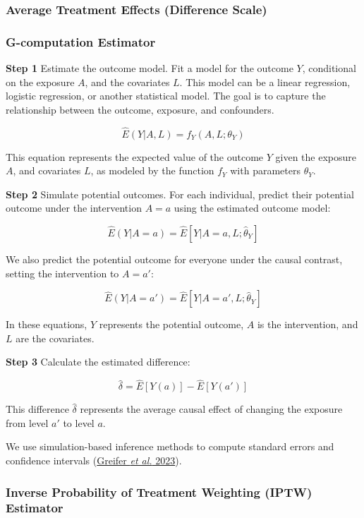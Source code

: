 \documentclass[
  singlecolumn]{article}
\begin{document}
\subsubsection{Average Treatment Effects (Difference
Scale)}\label{average-treatment-effects-difference-scale}

\subsubsection{\texorpdfstring{\textbf{G-computation
Estimator}}{G-computation Estimator}}\label{g-computation-estimator}

\textbf{Step 1} Estimate the outcome model. Fit a model for the outcome
\(Y\), conditional on the exposure \(A\), and the covariates \(L\). This
model can be a linear regression, logistic regression, or another
statistical model. The goal is to capture the relationship between the
outcome, exposure, and confounders.

\[ \hat{E}(Y|A,L) = f_Y(A,L; \theta_Y) \]

This equation represents the expected value of the outcome \(Y\) given
the exposure \(A\), and covariates \(L\), as modeled by the function
\(f_Y\) with parameters \(\theta_Y\).

\textbf{Step 2} Simulate potential outcomes. For each individual,
predict their potential outcome under the intervention \(A=a\) using the
estimated outcome model:

\[\hat{E}(Y|A=a)  = \hat{E}[Y|A=a,L; \hat{\theta}_Y]\]

We also predict the potential outcome for everyone under the causal
contrast, setting the intervention to \(A=a'\):

\[  \hat{E}(Y|A=a')  = \hat{E}[Y|A=a',L; \hat{\theta}_Y]\]

In these equations, \(Y\) represents the potential outcome, \(A\) is the
intervention, and \(L\) are the covariates.

\textbf{Step 3} Calculate the estimated difference:

\[\hat{\delta} = \hat{E}[Y(a)] - \hat{E}[Y(a')]\]

This difference \(\hat{\delta}\) represents the average causal effect of
changing the exposure from level \(a'\) to level \(a\).

We use simulation-based inference methods to compute standard errors and
confidence intervals (\hyperref[ref-greifer2023]{Greifer \emph{et al.}
2023}).

\subsubsection{\texorpdfstring{\textbf{Inverse Probability of Treatment
Weighting (IPTW)
Estimator}}{Inverse Probability of Treatment Weighting (IPTW) Estimator}}\label{inverse-probability-of-treatment-weighting-iptw-estimator}
\end{document}
